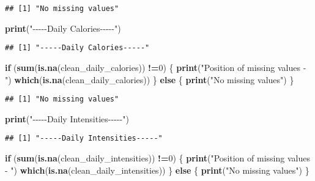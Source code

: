 \documentclass[
]{article}
\newenvironment{Shaded}{\begin{snugshade}}{\end{snugshade}}
\newcommand{\ControlFlowTok}[1]{\textcolor[rgb]{0.13,0.29,0.53}{\textbf{#1}}}
\newcommand{\DecValTok}[1]{\textcolor[rgb]{0.00,0.00,0.81}{#1}}
\newcommand{\FunctionTok}[1]{\textcolor[rgb]{0.13,0.29,0.53}{\textbf{#1}}}
\newcommand{\NormalTok}[1]{#1}
\newcommand{\SpecialCharTok}[1]{\textcolor[rgb]{0.81,0.36,0.00}{\textbf{#1}}}
\newcommand{\StringTok}[1]{\textcolor[rgb]{0.31,0.60,0.02}{#1}}
\begin{document}
\begin{verbatim}
## [1] "No missing values"
\end{verbatim}

\begin{Shaded}
\begin{Highlighting}[]
\FunctionTok{print}\NormalTok{(}\StringTok{"{-}{-}{-}{-}{-}Daily Calories{-}{-}{-}{-}{-}"}\NormalTok{)}
\end{Highlighting}
\end{Shaded}

\begin{verbatim}
## [1] "-----Daily Calories-----"
\end{verbatim}

\begin{Shaded}
\begin{Highlighting}[]
\ControlFlowTok{if}\NormalTok{ (}\FunctionTok{sum}\NormalTok{(}\FunctionTok{is.na}\NormalTok{(clean\_daily\_calories)) }\SpecialCharTok{!=}\DecValTok{0}\NormalTok{) \{}
  \FunctionTok{print}\NormalTok{(}\StringTok{"Position of missing values {-} "}\NormalTok{)}
  \FunctionTok{which}\NormalTok{(}\FunctionTok{is.na}\NormalTok{(clean\_daily\_calories))}
\NormalTok{\} }\ControlFlowTok{else}\NormalTok{ \{}
  \FunctionTok{print}\NormalTok{(}\StringTok{"No missing values"}\NormalTok{)}
\NormalTok{\}}
\end{Highlighting}
\end{Shaded}

\begin{verbatim}
## [1] "No missing values"
\end{verbatim}

\begin{Shaded}
\begin{Highlighting}[]
\FunctionTok{print}\NormalTok{(}\StringTok{"{-}{-}{-}{-}{-}Daily Intensities{-}{-}{-}{-}{-}"}\NormalTok{)}
\end{Highlighting}
\end{Shaded}

\begin{verbatim}
## [1] "-----Daily Intensities-----"
\end{verbatim}

\begin{Shaded}
\begin{Highlighting}[]
\ControlFlowTok{if}\NormalTok{ (}\FunctionTok{sum}\NormalTok{(}\FunctionTok{is.na}\NormalTok{(clean\_daily\_intensities)) }\SpecialCharTok{!=}\DecValTok{0}\NormalTok{) \{}
  \FunctionTok{print}\NormalTok{(}\StringTok{"Position of missing values {-} "}\NormalTok{)}
  \FunctionTok{which}\NormalTok{(}\FunctionTok{is.na}\NormalTok{(clean\_daily\_intensities))}
\NormalTok{\} }\ControlFlowTok{else}\NormalTok{ \{}
  \FunctionTok{print}\NormalTok{(}\StringTok{"No missing values"}\NormalTok{)}
\NormalTok{\}}
\end{Highlighting}
\end{Shaded}
\end{document}
